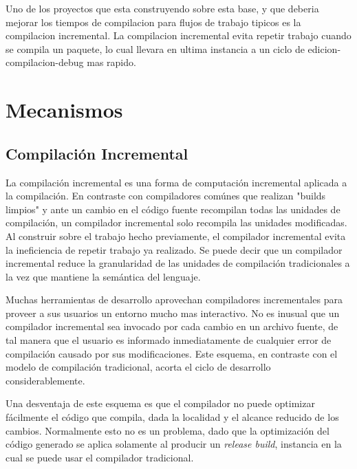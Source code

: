 \documentclass[12pt, a4paper]{report}
\begin{document}
Uno de los proyectos que esta construyendo sobre esta base, y que deberia mejorar los tiempos de compilacion para flujos de trabajo tipicos es la compilacion incremental.
La compilacion incremental evita repetir trabajo cuando se compila un paquete, lo cual llevara en ultima instancia a un ciclo de edicion-compilacion-debug mas rapido.
\cite{rust_blog_incremental_compilation}

\chapter*{Mecanismos}

\section*{Compilación Incremental}

La compilación incremental es una forma de computación incremental aplicada a la compilación.
En contraste con compiladores comúnes que realizan "builds limpios" y ante un cambio en el código fuente recompilan todas las unidades de compilación, un compilador incremental solo recompila las unidades modificadas.
Al construir sobre el trabajo hecho previamente, el compilador incremental evita la ineficiencia de repetir trabajo ya realizado.
Se puede decir que un compilador incremental reduce la granularidad de las unidades de compilación tradicionales a la vez que mantiene la semántica del lenguaje.
\cite{wiki_incremental_compiler}

Muchas herramientas de desarrollo aprovechan compiladores incrementales para proveer a sus usuarios un entorno mucho mas interactivo.
No es inusual que un compilador incremental sea invocado por cada cambio en un archivo fuente, de tal manera que el usuario es informado inmediatamente de cualquier error de compilación causado por sus modificaciones.
Este esquema, en contraste con el modelo de compilación tradicional, acorta el ciclo de desarrollo considerablemente.
\cite{wiki_incremental_compiler}

Una desventaja de este esquema es que el compilador no puede optimizar fácilmente el código que compila, dada la localidad y el alcance reducido de los cambios.
Normalmente esto no es un problema, dado que la optimización del código generado se aplica solamente al producir un \textit{release build}, instancia en la cual se puede usar el compilador tradicional.
\cite{wiki_incremental_compiler}
\end{document}
